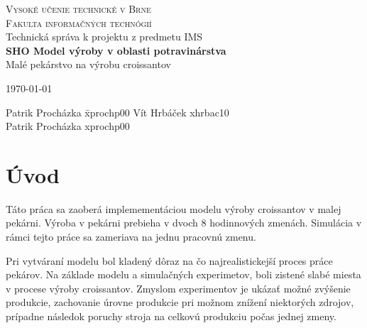 \documentclass[11pt]{article}
\begin{document}
\begin{titlepage}
    \begin{center}
        \Huge\textsc{Vysoké učenie technické v Brne}\\
        \huge\textsc{Fakulta informačných technógií}\\
        \LARGE Technická správa k projektu z predmetu IMS\\
        \huge \textbf{SHO Model výroby v oblasti potravinárstva}\\
        \Large Malé pekárstvo na výrobu croissantov\\
    \end{center}
    
    \begin{minipage}{0.4 \textwidth}
        \Large \today 
    \end{minipage}
        \hfill
    \begin{minipage}[r]{0.4 \textwidth}
        \Large
        \begin{tabbing}
            Patrik Procházka \qquad\= xprochp00 \kill
            Vít Hrbáček  \> xhrbac10 \\
            Patrik Procházka \> xprochp00 \\
        \end{tabbing}
    \end{minipage}
\end{titlepage}

\newpage

\tableofcontents
\newpage

\section{Úvod}
Táto práca sa zaoberá implemementáciou modelu výroby croissantov v malej pekárni. Výroba v pekárni prebieha v dvoch 8 hodinnových zmenách. Simulácia v rámci tejto práce sa zameriava na jednu pracovnú zmenu. \newline

Pri vytváraní modelu bol kladený dôraz na čo najrealistickejší proces práce pekárov. Na základe modelu a simulačných experimetov, boli zistené slabé miesta v procese výroby croissantov. Zmyslom experimentov je ukázať možné zvýšenie produkcie, zachovanie úrovne produkcie pri možnom znížení niektorých zdrojov, prípadne následok poruchy stroja na celkovú produkciu počas jednej zmeny.
\end{document}
